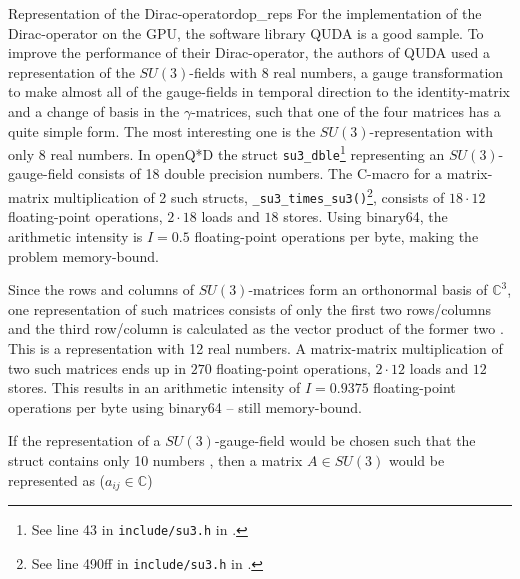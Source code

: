 \documentclass{article}
\theoremstyle{plain} %
\theoremstyle{convention} %
\theoremstyle{remark} %
\def\code#1{\texttt{#1}}
\numberwithin{equation}{section}
\begin{document}
\begin{proposal}{Representation of the Dirac-operator}{dop_reps}
For the implementation of the Dirac-operator on the GPU, the software library QUDA \cite{clark2010} is a good sample. To improve the performance of their Dirac-operator, the authors of QUDA used a representation of the $SU(3)$-fields with \num{8} real numbers, a gauge transformation to make almost all of the gauge-fields in temporal direction to the identity-matrix and a change of basis in the $\gamma$-matrices, such that one of the four matrices has a quite simple form. The most interesting one is the $SU(3)$-representation with only \num{8} real numbers. In openQ*D the struct \code{su3\_dble}\footnote{See line 43 in \code{include/su3.h} in \cite{openqxd}.} representing an $SU(3)$-gauge-field consists of \num{18} double precision numbers. The C-macro for a matrix-matrix multiplication of 2 such structs, \code{\_su3\_times\_su3()}\footnote{See line 490ff in \code{include/su3.h} in \cite{openqxd}.}, consists of $18 \cdot 12$ floating-point operations, $2 \cdot 18$ loads and $18$ stores. Using \gls{binary64}, the arithmetic intensity is $I = 0.5$ floating-point operations per byte, making the problem memory-bound.

Since the rows and columns of $SU(3)$-matrices form an orthonormal basis of $\mathbb{C}^3$, one representation of such matrices consists of only the first two rows/columns and the third row/column is calculated as the vector product of the former two \cite{deforcrand1985}. This is a representation with \num{12} real numbers. A matrix-matrix multiplication of two such matrices ends up in $270$ floating-point operations, $2 \cdot 12$ loads and $12$ stores. This results in an arithmetic intensity of $I = 0.9375$ floating-point operations per byte using \gls{binary64} -- still memory-bound.

If the representation of a $SU(3)$-gauge-field would be chosen such that the struct contains only \num{10} numbers \cite{bunk1986}, then a matrix $A \in SU(3)$ would be represented as ($a_{ij} \in \mathbb{C}$)


\end{proposal}
\end{document}
